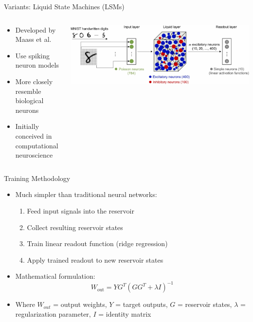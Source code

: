\documentclass{beamer}
\begin{document}
\begin{frame}{Variants: Liquid State Machines (LSMs)}
\begin{columns}
\begin{column}{0.5\textwidth}
\begin{itemize}
\item Developed by Maass et al.
\item Use spiking neuron models
\item More closely resemble biological neurons
\item Initially conceived in computational neuroscience
\end{itemize}
\end{column}
\begin{column}{0.5\textwidth}
\includegraphics[width=1\linewidth]{figures/lsm_diag.png}
\caption{Liquid State Machine diagram}
\end{column}
\end{columns}
\end{frame}

\begin{frame}{Training Methodology}
\begin{itemize}
\item Much simpler than traditional neural networks:
    \begin{enumerate}
    \item Feed input signals into the reservoir 
    \item Collect resulting reservoir states
    \item Train linear readout function (ridge regression)
    \item Apply trained readout to new reservoir states
    \end{enumerate}
\item Mathematical formulation:
\[
W_{\text{out}} = YG^T\left(GG^T + \lambda I\right)^{-1}
\]
\item Where $W_{out}$ = output weights, $Y$ = target outputs, $G$ = reservoir states, $\lambda$ = regularization parameter, $I$ = identity matrix
\end{itemize}
\end{frame}
\end{document}
